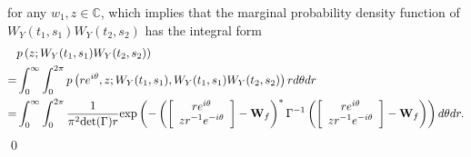 \documentclass{amsart}
\begin{document}
for any $w_{1},z\in \mathbb{C}$, 
which implies that the marginal probability density function of $W_{Y}(t_{1},s_{1})W_{Y}(t_{2},s_{2})$ has the integral form
\begin{align}\notag
&p\left(z;W_{Y}(t_{1},s_{1})W_{Y}(t_{2},s_{2})\right)
\\\notag=&\int_{0}^{\infty}\int_{0}^{2\pi}
p\left(re^{i\theta},z;W_{Y}(t_{1},s_{1}),W_{Y}(t_{1},s_{1})W_{Y}(t_{2},s_{2})\right)
r d\theta dr
\\\notag=&
\int_{0}^{\infty}\int_{0}^{2\pi} \frac{1}{\pi^{2}\textup{det}(\Gamma)r}
\textup{exp}\left(-\left(
\left[\begin{array}{cc}re^{i\theta}\\ zr^{-1}e^{-i\theta}\end{array}\right]-\mathbf{W}_{f}\right)^{*}
\Gamma^{-1}
\left(\left[\begin{array}{cc}re^{i\theta}\\ zr^{-1}e^{-i\theta}\end{array}\right]-\mathbf{W}_{f}\right)\right)d\theta dr.
\end{align}
\qed
\end{document}
